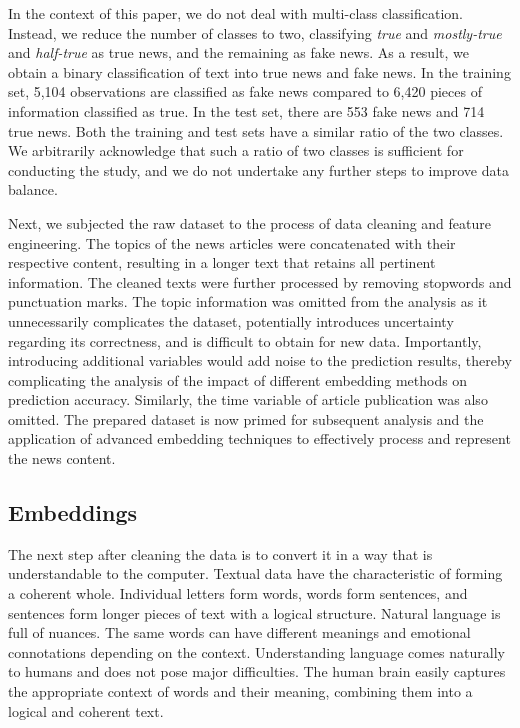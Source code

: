 In the context of this paper, we do not deal with multi-class classification. Instead, we reduce the number of classes to two, classifying \textit{true} and \textit{mostly-true} and \textit{half-true} as true news, and the remaining as fake news. As a result, we obtain a binary classification of text into true news and fake news. In the training set, 5,104 observations are classified as fake news compared to 6,420 pieces of information classified as true. In the test set, there are 553 fake news and 714 true news. Both the training and test sets have a similar ratio of the two classes. We arbitrarily acknowledge that such a ratio of two classes is sufficient for conducting the study, and we do not undertake any further steps to improve data balance.


Next, we subjected the raw dataset to the process of data cleaning and feature engineering. The topics of the news articles were concatenated with their respective content, resulting in a longer text that retains all pertinent information. The cleaned texts were further processed by removing stopwords and punctuation marks. The topic information was omitted from the analysis as it unnecessarily complicates the dataset, potentially introduces uncertainty regarding its correctness, and is difficult to obtain for new data. Importantly, introducing additional variables would add noise to the prediction results, thereby complicating the analysis of the impact of different embedding methods on prediction accuracy. Similarly, the time variable of article publication was also omitted. The prepared dataset is now primed for subsequent analysis and the application of advanced embedding techniques to effectively process and represent the news content. %

\subsection{Embeddings}

The next step after cleaning the data is to convert it in a way that is understandable to the computer. Textual data have the characteristic of forming a coherent whole. Individual letters form words, words form sentences, and sentences form longer pieces of text with a logical structure. Natural language is full of nuances. The same words can have different meanings and emotional connotations depending on the context. Understanding language comes naturally to humans and does not pose major difficulties. The human brain easily captures the appropriate context of words and their meaning, combining them into a logical and coherent text.


